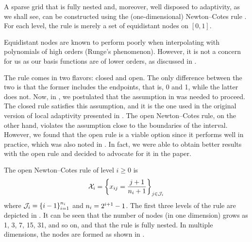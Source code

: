 A sparse grid that is fully nested and, moreover, well disposed to adaptivity,
as we shall see, can be constructed using the (one-dimensional) Newton--Cotes
rule \cite{ma2009}. For each level, the rule is merely a set of equidistant
nodes on $[0, 1]$.

\begin{remark}
Equidistant nodes are known to perform poorly when interpolating with
polynomials of high orders (Runge's phenomenon). However, it is not a concern
for us as our basis functions are of lower orders, as discussed in .
\end{remark}

The rule comes in two flavors: closed and open. The only difference between the
two is that the former includes the endpoints, that is, 0 and 1, while the
latter does not. Now, in , we postulated that the assumption in
 was needed to proceed. The closed rule satisfies this
assumption, and it is the one used in the original version of local adaptivity
presented in \cite{ma2009}. The open Newton--Cotes rule, on the other hand,
violates the assumption close to the boundaries of the interval. However, we
found that the open rule is a viable option since it performs well in practice,
which was also noted in \cite{klimke2006}. In fact, we were able to obtain
better results with the open rule and decided to advocate for it in the paper.


The open Newton--Cotes rule of level $i \geq 0$ is
\begin{equation} \elab{newton-cotes-grid}
  \X_i = \left\{ x_{ij} = \frac{j + 1}{\n_i + 1} \right\}_{j \in \oindex_i}
\end{equation}
where $\mathcal{J}_i = \left\{ i - 1 \right\}_{i = 1}^{n_i}$ and $n_i = 2^{i + 1}
- 1$. The first three levels of the rule are depicted in . It can be
seen that the number of nodes (in one dimension) grows as 1, 3, 7, 15, 31, and
so on, and that the rule is fully nested. In multiple dimensions, the nodes are
formed as shown in .
